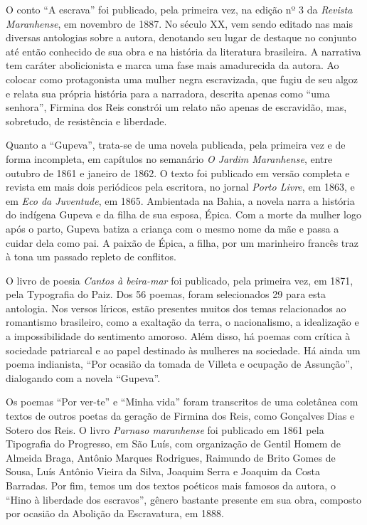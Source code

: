 \documentclass[12pt]{extarticle}
\begin{document}
O conto ``A escrava'' foi publicado, pela primeira vez, na edição nº 3
da \emph{Revista Maranhense}, em novembro de 1887. No século XX, vem
sendo editado nas mais diversas antologias sobre a autora, denotando seu
lugar de destaque no conjunto até então conhecido de sua obra e na
história da literatura brasileira. A narrativa tem caráter abolicionista
e marca uma fase mais amadurecida da autora. Ao colocar como
protagonista uma mulher negra escravizada, que fugiu de seu algoz e
relata sua própria história para a narradora, descrita apenas como ``uma
senhora'', Firmina dos Reis constrói um relato não apenas de escravidão,
mas, sobretudo, de resistência e liberdade.

Quanto a ``Gupeva'', trata-se de uma novela publicada, pela primeira vez
e de forma incompleta, em capítulos no semanário \emph{O Jardim
Maranhense}, entre outubro de 1861 e janeiro de 1862. O texto foi
publicado em versão completa e revista em mais dois periódicos pela
escritora, no jornal \emph{Porto Livre}, em 1863, e em \emph{Eco da
Juventude}, em 1865. Ambientada na Bahia, a novela narra a história do
indígena Gupeva e da filha de sua esposa, Épica. Com a morte da mulher
logo após o parto, Gupeva batiza a criança com o mesmo nome da mãe e
passa a cuidar dela como pai. A paixão de Épica, a filha, por um
marinheiro francês traz à tona um passado repleto de conflitos.

O livro de poesia \emph{Cantos à beira-mar} foi publicado, pela primeira
vez, em 1871, pela Typografia do Paiz. Dos 56 poemas, foram selecionados
29 para esta antologia. Nos versos líricos, estão presentes muitos dos
temas relacionados ao romantismo brasileiro, como a exaltação da terra,
o nacionalismo, a idealização e a impossibilidade do sentimento amoroso.
Além disso, há poemas com crítica à sociedade patriarcal e ao papel
destinado às mulheres na sociedade. Há ainda um poema indianista, ``Por
ocasião da tomada de Villeta e ocupação de Assunção'', dialogando com a
novela ``Gupeva''.

Os poemas ``Por ver-te'' e ``Minha vida'' foram transcritos de uma
coletânea com textos de outros poetas da geração de Firmina dos Reis,
como Gonçalves Dias e Sotero dos Reis. O livro \emph{Parnaso maranhense}
foi publicado em 1861 pela Tipografia do Progresso, em São Luís, com
organização de Gentil Homem de Almeida Braga, Antônio Marques Rodrigues,
Raimundo de Brito Gomes de Sousa, Luís Antônio Vieira da Silva, Joaquim
Serra e Joaquim da Costa Barradas. Por fim, temos um dos textos poéticos
mais famosos da autora, o ``Hino à liberdade dos escravos'', gênero
bastante presente em sua obra, composto por ocasião da Abolição da
Escravatura, em 1888.
\end{document}
